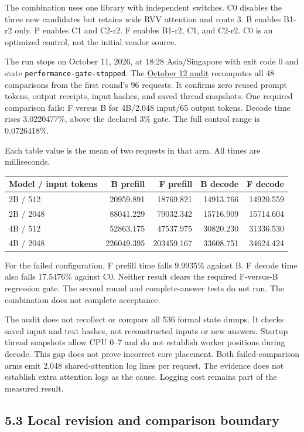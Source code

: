 \documentclass[10pt,a4paper]{article}
\begin{document}
The combination uses one library with independent switches. C0 disables
the three new candidates but retains wide RVV attention and route 3. B
enables B1-r2 only. P enables C1 and C2-r2. F enables B1-r2, C1, and
C2-r2. C0 is an optimized control, not the initial vendor source.

The run stops on October 11, 2026, at 18:28 Asia/Singapore with exit
code 0 and state \nolinkurl{performance-gate-stopped}. The
\href{https://github.com/MoyaMryia/riscv-accl/blob/main/spacemit/reports/2026-10-12-combined-stop-audit.md}{October
12 audit} recomputes all 48 comparisons from the first round's 96
requests. It confirms zero reused prompt tokens, output receipts, input
hashes, and saved thread snapshots. One required comparison fails: F
versus B for 4B/2,048 input/65 output tokens. Decode time rises
3.0220477\%, above the declared 3\% gate. The full control range is
0.0726418\%.

Each table value is the mean of two requests in that arm. All times are
milliseconds.

\begin{longtable}[]{@{}lrrrr@{}}
\toprule
Model / input tokens & B prefill & F prefill & B decode & F
decode\tabularnewline
\midrule
\endhead
2B / 512 & 20959.891 & 18769.821 & 14913.766 & 14920.559\tabularnewline
2B / 2048 & 88041.229 & 79032.342 & 15716.909 & 15714.604\tabularnewline
4B / 512 & 52863.175 & 47537.975 & 30820.230 & 31336.530\tabularnewline
4B / 2048 & 226049.395 & 203459.167 & 33608.751 &
34624.424\tabularnewline
\bottomrule
\end{longtable}

For the failed configuration, F prefill time falls 9.9935\% against B. F
decode time also falls 17.5476\% against C0. Neither result clears the
required F-versus-B regression gate. The second round and
complete-answer tests do not run. The combination does not complete
acceptance.

The audit does not recollect or compare all 536 formal state dumps. It
checks saved input and text hashes, not reconstructed inputs or new
answers. Startup thread snapshots allow CPU 0--7 and do not establish
worker positions during decode. This gap does not prove incorrect core
placement. Both failed-comparison arms emit 2,048 shared-attention log
lines per request. The evidence does not establish extra attention logs
as the cause. Logging cost remains part of the measured result.

\hypertarget{local-revision-and-comparison-boundary}{%
\subsection{5.3 Local revision and comparison
boundary}\label{local-revision-and-comparison-boundary}}
\end{document}
